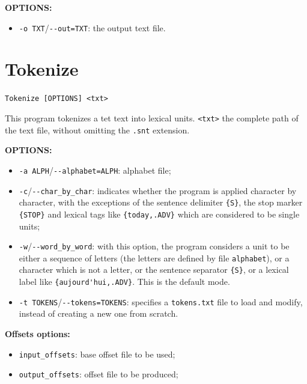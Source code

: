 \bigskip
\noindent \textbf{OPTIONS:}
\begin{itemize}
  \item \verb+-o TXT+/\verb+--out=TXT+: the output text file.
\end{itemize}







\section{Tokenize}
\label{section-Tokenize}
\verb+Tokenize [OPTIONS] <txt>+

\bigskip
\noindent This program tokenizes a tet text into lexical units.
\verb+<txt>+ the complete path of the text file, without omitting the \verb+.snt+ 
extension.

\bigskip
\noindent \textbf{OPTIONS:}
\begin{itemize}
  \item \verb+-a ALPH+/\verb+--alphabet=ALPH+: alphabet file;
  
  \item \verb+-c+/\verb+--char_by_char+: indicates whether the program is applied character by
  character, with the exceptions of the sentence delimiter \verb+{S}+,
  the stop marker \verb+{STOP}+ and lexical tags like \verb+{today,.ADV}+ which
  are considered to be single units;

 \item \verb+-w+/\verb+--word_by_word+: with this option, the program
  considers a unit to be either a sequence of letters (the letters are defined
  by file \verb+alphabet+), or a character which is not a letter, or the
  sentence separator \verb+{S}+, or a lexical label 
  like \verb+{aujourd'hui,.ADV}+. 
   This is the default mode.

 \item \verb+-t TOKENS+/\verb+--tokens=TOKENS+: specifies a \verb+tokens.txt+
 file to load and modify, instead of creating a new one from scratch.
\end{itemize}
\bigskip
\noindent \textbf{Offsets options:}
\begin{itemize}
  \item \verb+input_offsets+: base offset file to be used;
  \item \verb+output_offsets+: offset file to be produced;
\end{itemize}


